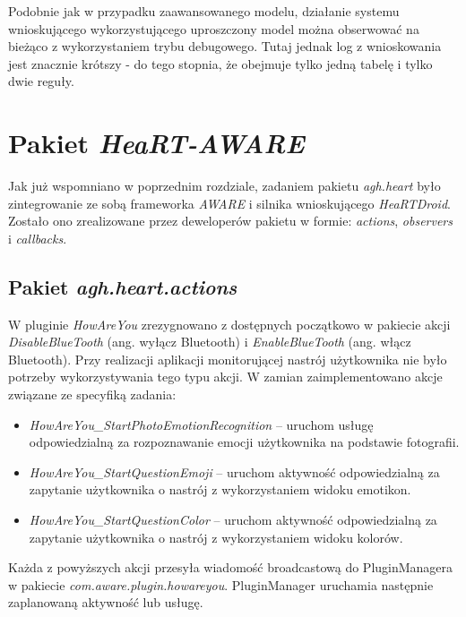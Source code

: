 Podobnie jak w przypadku zaawansowanego modelu, działanie systemu wnioskującego wykorzystującego uproszczony model można obserwować na bieżąco z wykorzystaniem trybu debugowego. Tutaj jednak log z wnioskowania jest znacznie krótszy - do tego stopnia, że obejmuje tylko jedną tabelę i tylko dwie reguły.


\section{Pakiet \textit{HeaRT-AWARE}}
\label{sec:pakietHeartAware2}

Jak już wspomniano w poprzednim rozdziale, zadaniem pakietu \textit{agh.heart} było zintegrowanie ze sobą frameworka \textit{AWARE} i silnika wnioskującego \textit{HeaRTDroid}. Zostało ono zrealizowane przez deweloperów pakietu w formie: \textit{actions}, \textit{observers} i \textit{callbacks}\cite{heartaware}.

\subsection{Pakiet \textit{agh.heart.actions}}

W pluginie \textit{HowAreYou} zrezygnowano z dostępnych początkowo w pakiecie akcji \textit{DisableBlueTooth} (ang. wyłącz Bluetooth) i \textit{EnableBlueTooth} (ang. włącz Bluetooth). Przy realizacji aplikacji monitorującej nastrój użytkownika nie było potrzeby wykorzystywania tego typu akcji. W zamian zaimplementowano akcje związane ze specyfiką zadania:

\begin{itemize}
	\item \textit{HowAreYou\_StartPhotoEmotionRecognition} -- uruchom usługę odpowiedzialną za rozpoznawanie emocji użytkownika na podstawie fotografii.
	\item \textit{HowAreYou\_StartQuestionEmoji} -- uruchom aktywność odpowiedzialną za zapytanie użytkownika o nastrój z wykorzystaniem widoku emotikon.
	\item \textit{HowAreYou\_StartQuestionColor} -- uruchom aktywność odpowiedzialną za zapytanie użytkownika o nastrój z wykorzystaniem widoku kolorów.
\end{itemize}

Każda z powyższych akcji przesyła wiadomość broadcastową do PluginManagera w pakiecie \textit{com.aware.plugin.howareyou}. PluginManager uruchamia następnie zaplanowaną aktywność lub usługę. 

